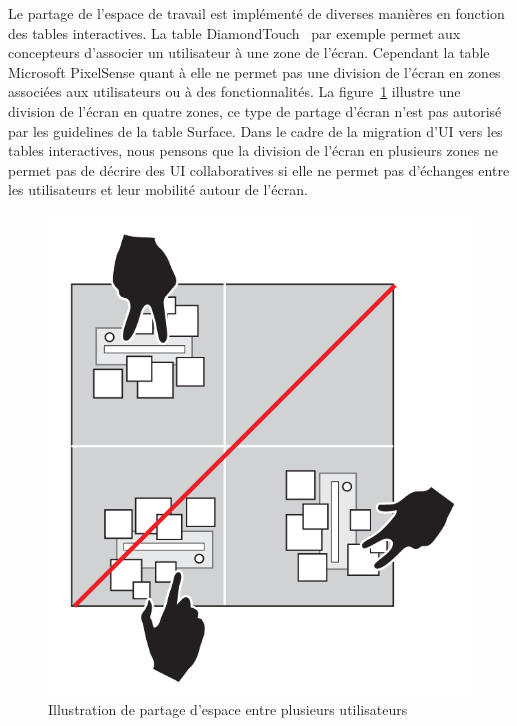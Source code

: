  
Le partage de l'espace de travail est implémenté de diverses manières en fonction des tables interactives. La table DiamondTouch~\cite{Dietz2001} par exemple permet aux concepteurs d'associer un utilisateur à une zone de l'écran. Cependant la table Microsoft PixelSense quant à elle ne permet pas une division de l'écran en zones associées aux utilisateurs ou à des fonctionnalités. La figure~\ref{fig:chap2:14} illustre une division de l'écran en quatre zones, ce type de partage d'écran n'est pas autorisé par les guidelines de la table Surface. Dans le cadre de la migration d'UI vers les tables interactives, nous pensons que la division de l'écran en plusieurs zones ne permet pas de décrire des UI collaboratives si elle ne permet pas d'échanges entre les utilisateurs et leur mobilité autour de l'écran.
\begin{figure}[h]
\begin{center}
\includegraphics[angle=270,scale=.2]{chap2/img-22} 
\caption{Illustration de partage d'espace entre plusieurs utilisateurs}
\label{fig:chap2:14}
\end{center}
\end{figure}


\\


